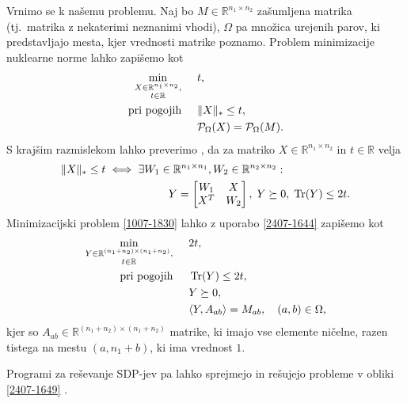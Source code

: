 Vrnimo se k našemu problemu. Naj bo $M \in \mathbb{R}^{n_1 \times n_2}$ zašumljena matrika (tj.\ matrika z nekaterimi neznanimi vhodi), $\Omega$ pa množica urejenih parov, ki predstavljajo mesta, kjer vrednosti matrike poznamo.
Problem minimizacije nuklearne norme lahko zapišemo kot
\begin{align}
\label{1007-1830}
\begin{split}
    \min_{\substack{X\in \mathbb R^{n_1\times n_2},\\ t\in \mathbb R}} \hspace{0.5cm}        & t,                                               \\
    \text{pri pogojih} \hspace{0.5cm} & \lVert X\rVert_* \leq t,  \\
                                      & \mathcal{P}_\Omega(X) = \mathcal{P}_\Omega(M).
\end{split}
\end{align}
S krajšim razmislekom lahko preverimo \cite[lema 2]{NNM-PHD}, da za matriko $X \in \mathbb{R}^{n_1 \times n_2}$ in $t \in \mathbb{R}$
velja 
\begin{align}
\label{2407-1644}
\begin{split}
\lVert X\rVert_* \leq t &\iff \exists W_1\in \mathbb{R}^{n_1 \times n_1}, W_2 \in \mathbb{R}^{n_2 \times n_2}:\\
&\hspace{2cm}
Y = \begin{bmatrix}
               W_1 & X                     \\
               X^T & W_2 
           \end{bmatrix},\;       Y \succeq 0,\; \operatorname{Tr}(Y) \leq 2t.
\end{split}
\end{align}
Minimizacijski problem \eqref{1007-1830} lahko z uporabo \eqref{2407-1644} zapišemo kot
\begin{align}
\label{2407-1649}
\begin{split}
    \min_{\substack{Y\in \mathbb R^{(n_1+n_2)\times (n_1+n_2)},\\ t\in \mathbb R}}     \hspace{0.5cm} & 2t,                        \\
    \text{pri pogojih} \hspace{0.5cm} & \operatorname{Tr}(Y) \leq 2t,           \\
                                  & Y \succeq 0,              \\
                                  & \langle Y, A_{ab} \rangle = M_{ab},\quad (a,b)\in \Omega,
\end{split}
\end{align}
kjer so $A_{ab} \in \mathbb{R}^{(n_1 + n_2) \times (n_1 + n_2)}$ matrike, ki imajo vse elemente ničelne, razen tistega na mestu $(a, n_1 + b)$, ki ima vrednost $1$.
\iffalse
Ker velja
\[
    \trOp{A}{B} = \sum_{i}^{n_1} \sum_{j}^{n_2} a_{ij}b_{ij}
\] je lahko videti, da je tak pogoj smiselen. 
\fi
Programi za reševanje SDP-jev pa lahko sprejmejo in rešujejo probleme v obliki \eqref{2407-1649}
\cite{Survey-NKS19}.
 

